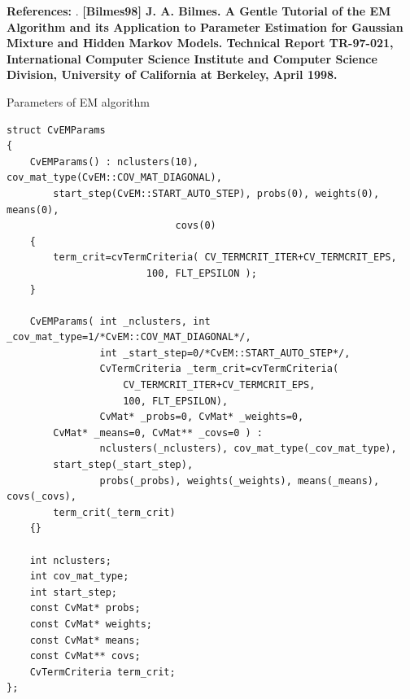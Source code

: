\textbf{References:}
. \textbf{[Bilmes98] J. A. Bilmes. A Gentle Tutorial of the EM Algorithm and its Application to Parameter Estimation for Gaussian Mixture and Hidden Markov Models. Technical Report TR-97-021, International Computer Science Institute and Computer Science Division, University of California at Berkeley, April 1998.}



Parameters of EM algorithm

\begin{lstlisting}
struct CvEMParams
{
    CvEMParams() : nclusters(10), cov_mat_type(CvEM::COV_MAT_DIAGONAL),
        start_step(CvEM::START_AUTO_STEP), probs(0), weights(0), means(0), 
						     covs(0)
    {
        term_crit=cvTermCriteria( CV_TERMCRIT_ITER+CV_TERMCRIT_EPS, 
						100, FLT_EPSILON );
    }

    CvEMParams( int _nclusters, int _cov_mat_type=1/*CvEM::COV_MAT_DIAGONAL*/,
                int _start_step=0/*CvEM::START_AUTO_STEP*/,
                CvTermCriteria _term_crit=cvTermCriteria(
					CV_TERMCRIT_ITER+CV_TERMCRIT_EPS, 
					100, FLT_EPSILON),
                CvMat* _probs=0, CvMat* _weights=0, 
		CvMat* _means=0, CvMat** _covs=0 ) :
                nclusters(_nclusters), cov_mat_type(_cov_mat_type), 
		start_step(_start_step),
                probs(_probs), weights(_weights), means(_means), covs(_covs), 
		term_crit(_term_crit)
    {}

    int nclusters;
    int cov_mat_type;
    int start_step;
    const CvMat* probs;
    const CvMat* weights;
    const CvMat* means;
    const CvMat** covs;
    CvTermCriteria term_crit;
};
\end{lstlisting}

